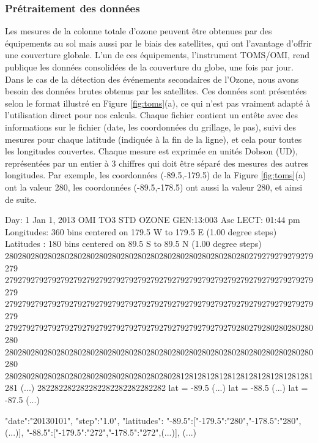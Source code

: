 \subsubsection{Prétraitement des données}

Les mesures de la colonne totale d'ozone peuvent être obtenues par des équipements au sol mais aussi par le biais des satellites, qui ont l'avantage d'offrir une couverture globale. L'un de ces équipements, l'instrument TOMS/OMI, rend publique les données consolidées de la couverture du globe, une fois par jour. Dans le cas de la détection des événements secondaires de l'Ozone, nous avons besoin des données brutes obtenus par les satellites. Ces données sont présentées selon le format illustré en Figure \ref{fig:toms}(a), ce qui n'est pas vraiment adapté à l'utilisation direct pour nos calculs. Chaque fichier contient un entête avec des informations sur le fichier (date, les coordonnées du grillage, le pas), suivi des mesures pour chaque latitude (indiquée à la fin de la ligne), et cela pour toutes les longitudes couvertes. Chaque mesure est exprimée en unités Dobson (UD), représentées par un entier à 3 chiffres qui doit être séparé des mesures des autres longitudes. Par exemple, les coordonnées (-89.5,-179.5) de la Figure \ref{fig:toms}(a) ont la valeur 280, les coordonnées (-89.5,-178.5) ont aussi la valeur 280, et ainsi de suite.   

\begin{myverbbox}[\tiny]{\TOMS}
	Day:   1 Jan  1, 2013    OMI TO3    STD OZONE    GEN:13:003 Asc LECT: 01:44 pm 
	Longitudes:  360 bins centered on 179.5  W  to 179.5  E   (1.00 degree steps)
	Latitudes :  180 bins centered on  89.5  S  to  89.5  N   (1.00 degree steps)
	280280280280280280280280280280280280280280280280280280280279279279279279279
	279279279279279279279279279279279279279279279279279279279279279279279279279
	279279279279279279279279279279279279279279279279279279279279279279279279279
	279279279279279279279279279279279279279279279279279279280279280280280280280
	280280280280280280280280280280280280280280280280280280280280280280280280280
	280280280280280280280280280280280280280281281281281281281281281281281281281
	(...)
	282282282282282282282282282282   lat =  -89.5
	(...)   lat =  -88.5
	(...)   lat =  -87.5
	(...)
\end{myverbbox}

\begin{myverbbox}[\tiny]{\JSON}
	{
		"date":"20130101",
		"step":"1.0",
		"latitudes":{
			"-89.5":["-179.5":"280","-178.5":"280",(...)],
			"-88.5":["-179.5":"272","-178.5":"272",(...)],
			(...)
		}
	}
\end{myverbbox}

